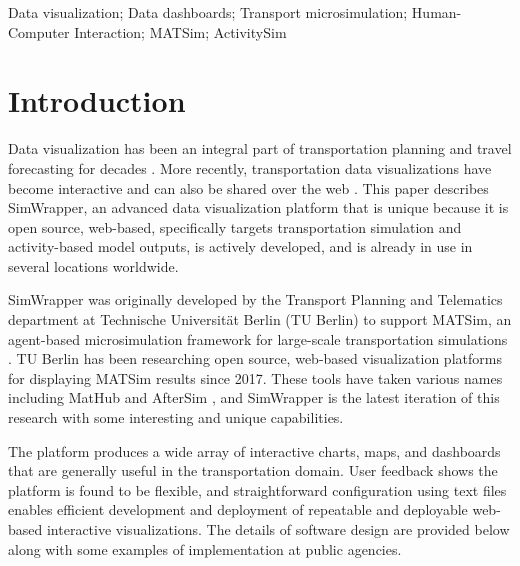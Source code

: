 \documentclass[3p,times,procedia]{elsarticle}
\begin{document}
\begin{frontmatter}
\begin{abstract}
\end{abstract}

\begin{keyword}
Data visualization; Data dashboards; Transport microsimulation; Human-Computer Interaction; MATSim; ActivitySim
\end{keyword}
\end{frontmatter}




\section{Introduction}

Data visualization has been an integral part of transportation planning and travel forecasting for decades \cite{dueker1990geographic}. More recently, transportation data visualizations have become interactive and can also be shared over the web \cite{NAP24755}. This paper describes SimWrapper, an advanced data visualization platform that is unique because it is open source, web-based, specifically targets transportation simulation and activity-based model outputs, is actively developed, and is already in use in several locations worldwide.

SimWrapper was originally developed by the Transport Planning and Telematics department at Technische Universität Berlin (TU Berlin) to support MATSim, an agent-based microsimulation framework for large-scale transportation simulations \cite{MATSimBook}. TU Berlin has been researching open source, web-based visualization platforms for displaying MATSim results since 2017.  These tools have taken various names including MatHub \cite{CharltonLaudan2020WebBasedVisualization} and AfterSim \cite{CHARLTON2021728}, and SimWrapper is the latest iteration of this research with some interesting and unique capabilities.

The platform produces a wide array of interactive charts, maps, and dashboards that are generally useful in the transportation domain. User feedback shows the platform is found to be flexible, and straightforward configuration using text files enables efficient development and deployment of repeatable and deployable web-based interactive visualizations. The details of software design are provided below along with some examples of implementation at public agencies.
\end{document}
